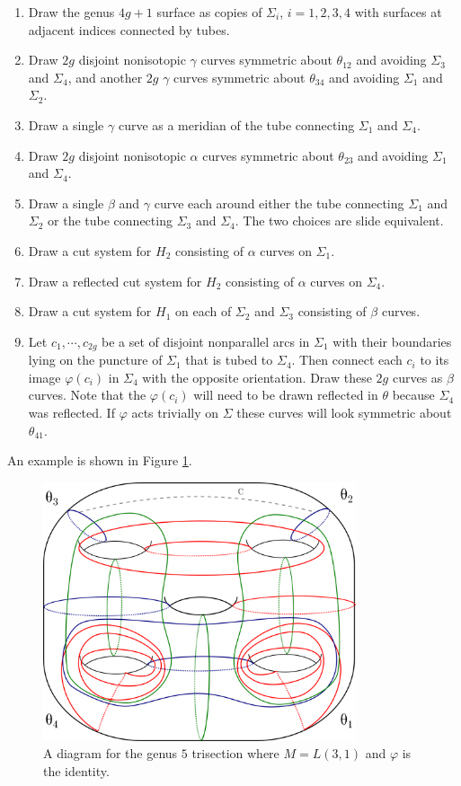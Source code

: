 \documentclass[12pt]{amsart}
\theoremstyle{definition}
\theoremstyle{remark}
\begin{document}
\begin{enumerate}
\item Draw the genus $4g+1$ surface as copies of $\Sigma_i$, $i = 1,2,3,4$ with surfaces at adjacent indices connected by tubes.
\item Draw $2g$ disjoint nonisotopic $\gamma$ curves symmetric about $\theta_{12}$ and avoiding $\Sigma_3$ and $\Sigma_4$, and another $2g$ $\gamma$ curves symmetric about $\theta_{34}$ and avoiding $\Sigma_1$ and $\Sigma_2$.
\item Draw a single $\gamma$ curve as a meridian of the tube connecting $\Sigma_1$ and $\Sigma_4$.
\item Draw $2g$ disjoint nonisotopic $\alpha$ curves symmetric about $\theta_{23}$ and avoiding $\Sigma_1$ and $\Sigma_4$.
\item Draw a single $\beta$ and $\gamma$ curve each around either the tube connecting $\Sigma_1$ and $\Sigma_2$ or the tube connecting $\Sigma_3$ and $\Sigma_4$.  The two choices are slide equivalent.
\item Draw a cut system for $H_2$ consisting of $\alpha$ curves on $\Sigma_1$.
\item Draw a reflected cut system for $H_2$ consisting of $\alpha$ curves on $\Sigma_4$.
\item Draw a cut system for $H_1$ on each of $\Sigma_2$ and $\Sigma_3$ consisting of $\beta$ curves.
\item Let $c_1,\cdots,c_{2g}$ be a set of disjoint nonparallel arcs in $\Sigma_1$ with their boundaries lying on the puncture of $\Sigma_1$ that is tubed to $\Sigma_4$.  Then connect each $c_i$ to its image $\varphi(c_i)$ in $\Sigma_4$ with the opposite orientation.  Draw these $2g$ curves as $\beta$ curves.  Note that the $\varphi(c_i)$ will need to be drawn reflected in $\theta$ because $\Sigma_4$ was reflected.  If $\varphi$ acts trivially on $\Sigma$ these curves will look symmetric about $\theta_{41}$.
\end{enumerate}

An example is shown in Figure \ref{unbalancedex}.



\begin{figure}[h]
\centering
\includegraphics[height=3in]{LxS12.png}
\caption{A diagram for the genus $5$ trisection where $M = L(3,1)$ and $\varphi$ is the identity. }
\label{unbalancedex}
\end{figure}
\end{document}
